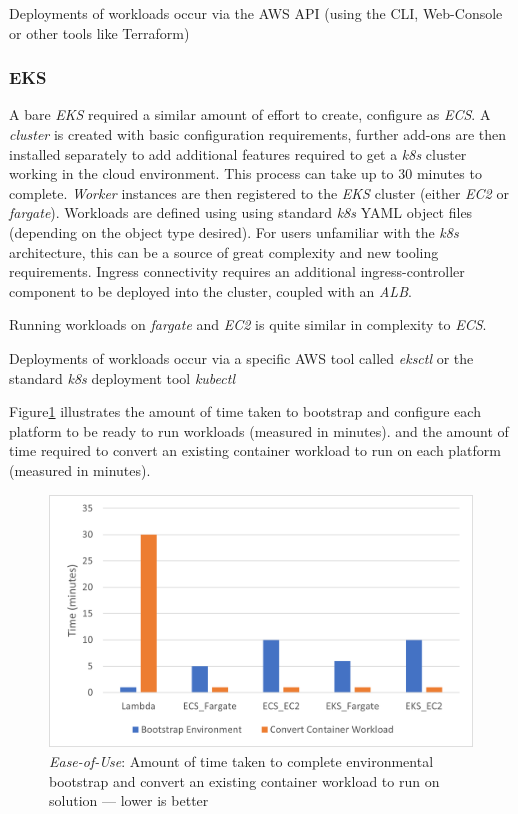 Deployments of workloads occur via the AWS API (using the CLI, Web-Console or other tools like Terraform)

\subsubsection{EKS}
A bare \textit{EKS} required a similar amount of effort to create, configure as \textit{ECS}. A \emph{cluster} is created with basic configuration requirements,
further add-ons are then installed separately to add additional features required to get a \textit{k8s} cluster working in the cloud environment.
This process can take up to 30 minutes to complete.
\textit{Worker} instances are then registered to the \textit{EKS} cluster (either \textit{EC2} or \textit{fargate}).
Workloads are defined using using standard \textit{k8s} YAML object files (depending on the object type desired).
For users unfamiliar with the \textit{k8s} architecture, this can be a source of great complexity and new tooling requirements.
Ingress connectivity requires an additional ingress-controller component to be deployed into the cluster, coupled with an \textit{ALB}.

Running workloads on \textit{fargate} and \textit{EC2} is quite similar in complexity to \textit{ECS}.

Deployments of workloads occur via a specific AWS tool called \emph{eksctl}\cite{weaveworks} or the standard \textit{k8s} deployment tool \emph{kubectl}\cite{kubectl}

Figure\ref{fig:eou} illustrates the amount of time taken to bootstrap and configure each platform to be ready to run workloads (measured in minutes).
and the amount of time required to convert an existing container workload to run on each platform (measured in minutes).

\begin{figure}[htbp]
  \includegraphics[width=\textwidth]{images/eou.png}
  \caption{\emph{Ease-of-Use}: Amount of time taken to complete environmental bootstrap and convert an existing container workload to run on solution --- lower is better}
  \label{fig:eou}
\end{figure}
